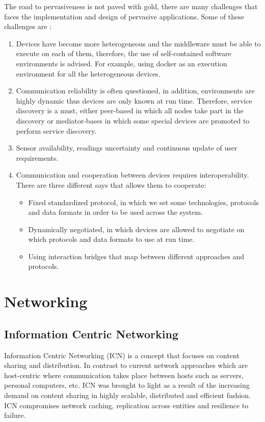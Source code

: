 The road to pervasiveness is not paved with gold, there are many challenges that faces the implementation and design of pervasive applications. Some of these challenges are \cite{Schiele2010}:
\begin{enumerate}
\item Devices have become more heterogeneous and the middleware must be able to execute on each of them, therefore, the use of self-contained software environments is advised. For example, using docker as an execution environment for all the heterogeneous devices.
\item Communication reliability is often questioned, in addition,  environments are highly dynamic thus devices are only known at run time.   Therefore, service discovery is a must, either peer-based in which all nodes  take part in the discovery or mediator-bases in which some special devices are promoted to perform service discovery.
\item Sensor availability, readings uncertainty and continuous update of user requirements.
\item Communication and cooperation between devices requires interoperability. There are three different says that allows them to cooperate:

\begin{itemize}
\item Fixed standardized protocol, in which we set some technologies, protocols and data formats in order to be used across the system.
\item Dynamically negotiated, in which devices are allowed to negotiate on which protocols and data formats to use  at run time.
\item Using interaction bridges that map between different approaches and protocols.
\end{itemize}

\end{enumerate} 








\section{Networking}
\subsection{Information Centric Networking}
Information Centric Networking (ICN) is a concept that focuses on content sharing and distribution. In contrast to current network approaches which are host-centric where communication takes place between hosts such as servers, personal computers, etc. ICN was brought to light as a result of the increasing demand on content sharing in highly scalable, distributed and efficient fashion. ICN compromises network caching, replication across entities and resilience to failure.

